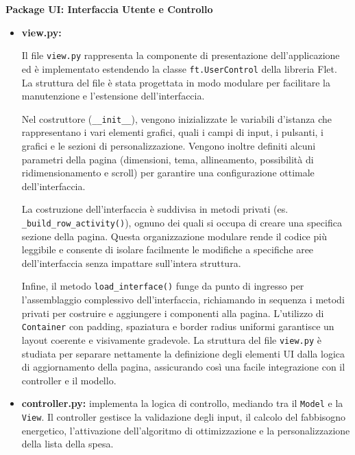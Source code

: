 \documentclass[11pt,a4paper]{article}
\begin{document}
\textbf{Package UI: Interfaccia Utente e Controllo} \\
\begin{itemize}
    \item \textbf{view.py:}

Il file \texttt{view.py} rappresenta la componente di presentazione dell'applicazione ed è implementato estendendo la classe \texttt{ft.UserControl} della libreria Flet. La struttura del file è stata progettata in modo modulare per facilitare la manutenzione e l'estensione dell'interfaccia.

Nel costruttore (\texttt{\_\_init\_\_}), vengono inizializzate le variabili d'istanza che rappresentano i vari elementi grafici, quali i campi di input, i pulsanti, i grafici e le sezioni di personalizzazione. Vengono inoltre definiti alcuni parametri della pagina (dimensioni, tema, allineamento, possibilità di ridimensionamento e scroll) per garantire una configurazione ottimale dell'interfaccia.

La costruzione dell'interfaccia è suddivisa in metodi privati (es.
\texttt{\_build\_row\_activity()}), ognuno dei quali si occupa di creare una specifica sezione della pagina. Questa organizzazione modulare rende il codice più leggibile e consente di isolare facilmente le modifiche a specifiche aree dell'interfaccia senza impattare sull'intera struttura.

Infine, il metodo \texttt{load\_interface()} funge da punto di ingresso per l'assemblaggio complessivo dell'interfaccia, richiamando in sequenza i metodi privati per costruire e aggiungere i componenti alla pagina. L'utilizzo di \texttt{Container} con padding, spaziatura e border radius uniformi garantisce un layout coerente e visivamente gradevole. La struttura del file \texttt{view.py} è studiata per separare nettamente la definizione degli elementi UI dalla logica di aggiornamento della pagina, assicurando così una facile integrazione con il controller e il modello.

    \item \textbf{controller.py:} implementa la logica di controllo, mediando tra il \texttt{Model} e la \texttt{View}. Il controller gestisce la validazione degli input, il calcolo del fabbisogno energetico, l'attivazione dell'algoritmo di ottimizzazione e la personalizzazione della lista della spesa.
\end{itemize}
\end{document}
